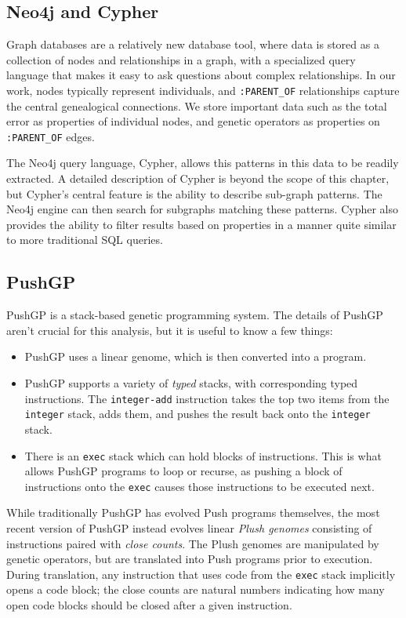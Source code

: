 \subsection{Neo4j and Cypher}
\label{subsec:Neo4j}

Graph databases \citep{Robinson:GraphDB:Book} are a relatively new database tool, where data is stored 
as a collection of nodes and relationships in a graph, with a specialized query language that makes 
it easy to ask questions about complex relationships.
In our work, nodes typically represent individuals, and \texttt{:PARENT\_OF} relationships 
capture the central genealogical connections. We store important data such as the total error as
properties of individual nodes, and genetic operators as properties on 
\texttt{:PARENT\_OF} edges.

The Neo4j query language, Cypher, allows this patterns in this data to be readily extracted.
A detailed description of Cypher is beyond the scope of this chapter, but Cypher's central feature is
the ability to describe sub-graph patterns. The Neo4j engine can then search
for subgraphs matching these patterns. Cypher also provides the ability to 
filter results based on properties in a manner quite similar to more traditional SQL queries.

\subsection{PushGP}

PushGP \citep{spector:2002:GPEM, 1068292:new} is a stack-based genetic programming system. The details
of PushGP aren't crucial for this analysis, but it is useful to know a few things:
\begin{itemize}
	\item PushGP uses a linear genome, which is then converted into a program.
	\item PushGP supports a variety of \emph{typed} stacks, with corresponding typed instructions.
	The \texttt{integer-add} instruction takes the top two items from the \texttt{integer}
	stack, adds them, and pushes the result back onto the \texttt{integer} stack.
	\item There is an \texttt{exec} stack which can hold blocks of instructions. This is what allows
	PushGP programs to loop or recurse, as pushing a block of instructions onto the \texttt{exec}
	causes those instructions to be executed next.
\end{itemize}

While traditionally PushGP has evolved Push programs themselves, the most recent version of PushGP instead evolves linear
\emph{Plush genomes} consisting of 
instructions paired with \emph{close counts}.
The Plush genomes are manipulated by genetic operators, but are translated into Push programs prior to execution.
During translation, any instruction that uses code from the \texttt{exec} stack implicitly opens a code block; the close counts are natural numbers 
indicating how many open code blocks should be closed after a given instruction.

